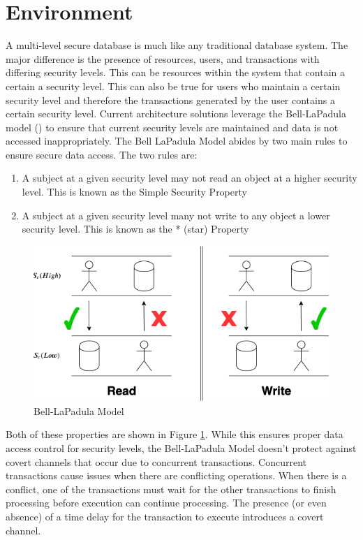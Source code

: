 \section{Environment}
\label{mls:environment}

A multi-level secure database is much like any traditional database system. The major difference is the presence of resources, users, and transactions with differing security levels. This can be resources within the system that contain a certain a security level. This can also be true for users who maintain a certain security level and therefore the transactions generated by the user contains a certain security level. Current architecture solutions leverage the Bell-LaPadula model (\cite{bell_secure_1973}) to ensure that current security levels are maintained and data is not accessed inappropriately. The Bell LaPadula Model abides by two main rules to ensure secure data access. The two rules are:

\begin{enumerate}
  \item A subject at a given security level may not read an object at a higher security level. This is known as the Simple Security Property
  \item A subject at a given security level many not write to any object a lower security level. This is known as the * (star) Property
\end{enumerate}

\begin{figure}
\centering
\includegraphics[scale=0.45]{images/BellLapadulaModel.png}
\caption{Bell-LaPadula Model}
\label{fig:bell_lapadula_model}
\end{figure}

Both of these properties are shown in Figure \ref{fig:bell_lapadula_model}. While this ensures proper data access control for security levels, the Bell-LaPadula Model doesn't protect against covert channels that occur due to concurrent transactions. Concurrent transactions cause issues when there are conflicting operations. When there is a conflict, one of the transactions must wait for the other transactions to finish processing before execution can continue processing. The presence (or even absence) of a time delay for the transaction to execute introduces a covert channel. 

